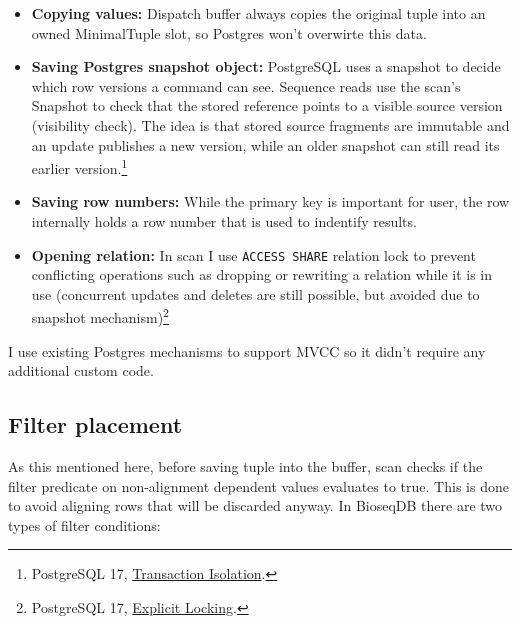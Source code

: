 \begin{itemize}
  \item \textbf{Copying values:} Dispatch buffer always copies the original tuple into an owned MinimalTuple slot, so Postgres won't overwirte this data.
  \item \textbf{Saving Postgres snapshot object:} PostgreSQL uses a snapshot to
    decide which row versions a command can see. Sequence reads use the scan's Snapshot to check that the stored reference points to a visible source version (visibility check). The idea is that stored source fragments are immutable and an update publishes a new version, while an older snapshot can still read its earlier version.\footnote{PostgreSQL 17,
    \href{https://www.postgresql.org/docs/17/transaction-iso.html}
    {Transaction Isolation}.}
  \item \textbf{Saving row numbers:} While the primary key is important for user, the row internally holds a row number that is used to indentify results.
  \item \textbf{Opening relation:} In scan I use 
    \texttt{ACCESS SHARE} relation lock to prevent conflicting operations such as dropping or
    rewriting a relation while it is in use (concurrent updates and deletes are still possible, but avoided due to snapshot mechanism)\footnote{PostgreSQL 17,
    \href{https://www.postgresql.org/docs/17/explicit-locking.html}
    {Explicit Locking}.}
\end{itemize}
I use existing Postgres mechanisms to support MVCC so it didn't require any additional custom code.

\subsection{Filter placement}
\label{sec:filter-placement}

As this mentioned here, before saving tuple into the buffer, scan checks if the filter predicate on non-alignment dependent values evaluates to true. This is done to avoid aligning rows that will be discarded anyway.
In BioseqDB there are two types of filter conditions:

